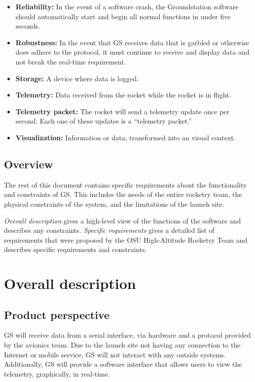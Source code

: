 \documentclass[10pt,draftclsnofoot,onecolumn]{IEEEtran}
\begin{document}
\begin{itemize}
		\item \textbf{Reliability:} In the event of a software crash, the Groundstation software should automatically
		start and begin all normal functions in under five seconds.
		\item \textbf{Robustness:} In the event that GS receives data that is garbled or otherwise does adhere
		to the protocol, it must continue to receive and display data and not break the real-time requirement.
		\item \textbf{Storage:} A device where data is logged.		
		\item \textbf{Telemetry:} Data received from the rocket while the rocket is in flight.
		\item \textbf{Telemetry packet:} The rocket will send a telemetry update once per second. Each one of these updates is a ``telemetry packet.''
		\item \textbf{Visualization:} Information or data, transformed into an visual context.
	\end{itemize}	
	
	\subsection{Overview}
	The rest of this document contains specific requirements about the functionality and constraints of GS. This includes
	the needs of the entire rocketry team, the physical constraints of the system, and the limitations of the launch site.
	
	\textit{Overall description} gives a high-level view of the functions of the software and describes any constraints.
	\textit{Specific requirements} gives a detailed list of requirements that were proposed by the OSU High-Altitude
	Rocketry Team and describes specific requirements and constraints.
		
	
	\section{Overall description}
	\subsection{Product perspective}
	GS will receive data from a serial interface, via hardware and a protocol provided by the avionics team.
	Due to the launch site not having any connection to the Internet or mobile service, GS will not interact with
	any outside systems. 
	Additionally, GS will provide a software interface that allows users to view the telemetry,
	graphically, in real-time.
\end{document}

